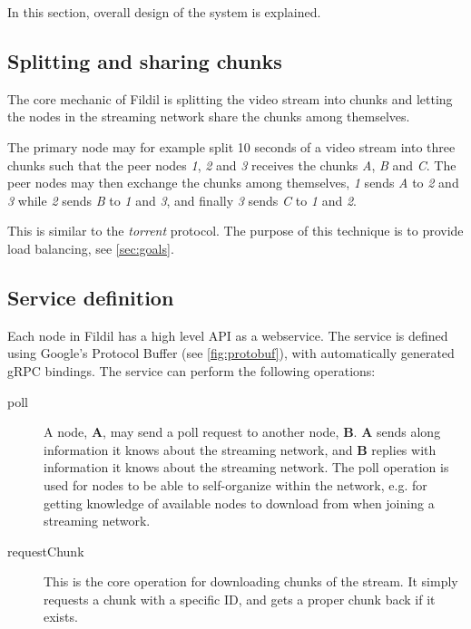 \documentclass[10pt, a4paper]{article}
\begin{document}
In this section, overall design of the system is explained.

\subsection{Splitting and sharing chunks}

The core mechanic of Fildil is splitting the video stream into chunks
and letting the nodes in the streaming network share the chunks among
themselves. 

The primary node may for example split 10 seconds of a video stream
into three chunks such that the peer nodes \emph{1}, \emph{2} and
\emph{3} receives the chunks \emph{A}, \emph{B} and \emph{C}. The peer
nodes may then exchange the chunks among themselves, \emph{1}
sends \emph{A} to \emph{2} and \emph{3} while \emph{2} sends \emph{B}
to \emph{1} and \emph{3}, and finally \emph{3} sends \emph{C} to
\emph{1} and \emph{2}.

This is similar to the \emph{torrent} protocol. The purpose of this
technique is to provide load balancing, see \autoref{sec:goals}.


\subsection{Service definition}
\label{sec:protobuf}

Each node in Fildil has a high level API as a webservice. The service
is defined using Google's Protocol Buffer (see
\autoref{fig:protobuf}), with automatically generated gRPC
bindings. The service can perform the following operations:

\begin{description}
\item[poll] A node, \textbf{A}, may send a poll request to another
  node, \textbf{B}. \textbf{A} sends along information it knows about
  the streaming network, and \textbf{B} replies with information it
  knows about the streaming network. The poll operation is used for
  nodes to be able to self-organize within the network, e.g. for
  getting knowledge of available nodes to download from when joining a
  streaming network.
\item[requestChunk] This is the core operation for downloading chunks
  of the stream. It simply requests a chunk with a specific ID, and
  gets a proper chunk back if it exists.
\end{description}
\end{document}
